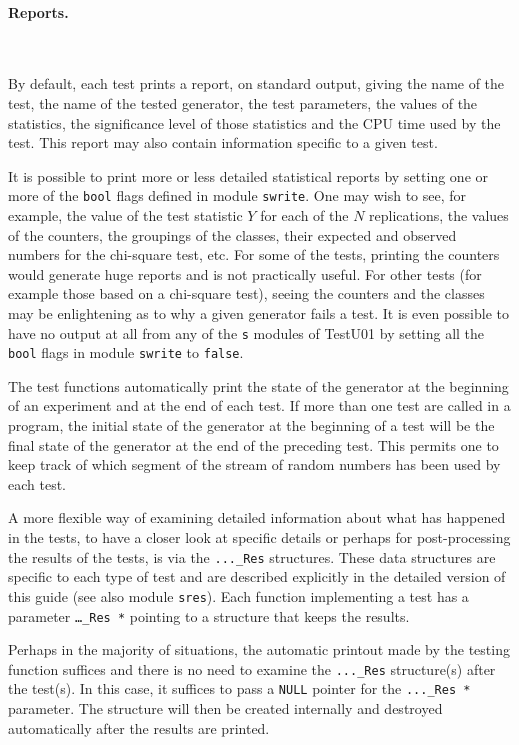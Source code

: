 \paragraph*{Reports.} \

By default, each test prints a report, on standard output,
giving the name of the test, the name of the tested generator,
the test parameters, the values of the statistics,
the significance level of those statistics
and the CPU time used by the test.
This report may also contain information specific to a given test.

It is possible to print more or less detailed statistical reports
by setting one or more of the {\tt bool} flags defined in module {\tt swrite}.
One may wish to see, for example, the value of the test
statistic $Y$ for each of the $N$ replications,
the values of the counters, the groupings of the classes, their
expected and observed numbers for the chi-square test, etc.
For some of the tests, printing the counters would generate huge reports
and is not practically useful. For other tests (for example those
based on a chi-square test), seeing the counters and the classes may be
enlightening as to why a given generator fails a test.
It is even possible to have no output at all from any of the {\tt s}
modules of TestU01 by setting all the {\tt bool} flags in module {\tt swrite}
 to {\tt false}.

The test functions automatically print the state of the generator
at the beginning of an experiment and at the end of each test.
If more than one test are called in a program, the initial state
of the generator at the beginning of a test will be the final state
of the generator at the end of the preceding test. This permits one to
keep track of which segment of the stream of random numbers has been
used by each test.

A more flexible way of examining detailed information
about what has happened in the tests, to have a closer look at
specific details or perhaps for post-processing the results of the tests,
is via the {\tt ...\_Res} structures.
These data structures are specific to each type of test and
are described explicitly in the detailed version of this guide
(see also module {\tt sres}).
Each function implementing a test has a parameter {\tt \ldots\_Res *}
pointing to a structure that keeps the results.

Perhaps in the majority of situations, the automatic printout made
by the testing function suffices and there is no need to
examine the {\tt ...\_Res} structure(s) after the test(s).
In this case, it suffices to pass
a {\tt NULL} pointer for the {\tt ...\_Res *} parameter.
The structure will then be created internally and destroyed automatically
after the results are printed.



